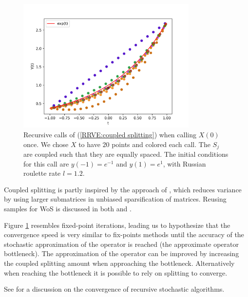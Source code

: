 \documentclass[a4paper,12pt]{article}
\begin{document}
\begin{figure}[h!]
  \centering
  \includegraphics[width=0.8\textwidth]{plots/coupled_split.png}
  \caption{Recursive calls of (\ref{RRVE:coupled splitting}) when
  calling $X(0)$ once. We chose $X$ to have $20$ points and
  colored each call. The $S_{j}$ are coupled such that
  they are equally spaced.
  The initial conditions for this call are $y(-1)=e^{-1}$ and $y(1)=e^{1}$,
  with Russian roulette rate $l=1.2$. }
  \label{fig:coupled splitting}
\end{figure}

\begin{related}
  Coupled splitting is partly inspired by the approach
  of \cite{sabelfeld_sparsified_2009}, which reduces
  variance by using larger submatrices in unbiased sparsification
  of matrices.
  Reusing samples for WoS is discussed in both
  \cite{miller_boundary_2023} and \cite{bakbouk_mean_2023}.
\end{related}

Figure \ref{fig:coupled splitting}
resembles fixed-point iterations, leading us to hypothesize
that the convergence
speed is very similar to fix-points methods until the accuracy
of the stochastic approximation of the operator is reached
(the approximate operator bottleneck). The approximation of the operator
can be improved by increasing the coupled splitting amount when
approaching the bottleneck. Alternatively when reaching
the bottleneck it is possible to rely on splitting to converge.

\begin{related}
  See \cite{gupta_convergence_2021} for a discussion on the convergence
  of recursive stochastic algorithms.
\end{related}
\end{document}

